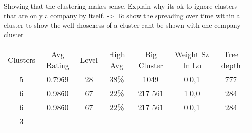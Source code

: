 Showing that the clustering makes sense. Explain why its ok to ignore clusters that are only a company by itself. ->
To show the spreading over time within a cluster to show the well choseness of a cluster cant be shown with one company
cluster

{\small
\begin{tabular}{ccccccc}
  Clusters & Avg Rating & Level & High Avg & Big Cluster & Weight Sz In Lo & Tree depth \\
    5 & 0.7969 & 28 & 38\% & 1049 & 0,0,1 & 777 \\
    6 & 0.9860 & 67 & 22\% & 217 \(561\) &  1,0,0 & 284 \\
    6 & 0.9860 & 67 & 22\% & 217 \(561\) &  0,0,1 & 284 \\
    3 &
\end{tabular}
}
